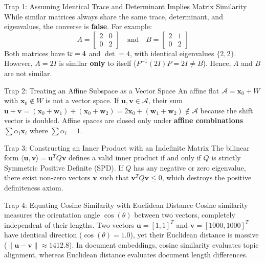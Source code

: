 \begin{trapbox}{Trap 1: Assuming Identical Trace and Determinant Implies Matrix Similarity}
While similar matrices always share the same trace, determinant, and eigenvalues, the converse is \textbf{false}. For example:
\begin{equation*}
A = \begin{bmatrix} 2 & 0 \\ 0 & 2 \end{bmatrix} \quad \text{and} \quad B = \begin{bmatrix} 2 & 1 \\ 0 & 2 \end{bmatrix}
\end{equation*}
Both matrices have $\operatorname{tr} = 4$ and $\det = 4$, with identical eigenvalues $\{2, 2\}$. However, $A = 2I$ is similar \textbf{only} to itself ($P^{-1}(2I)P = 2I \neq B$). Hence, $A$ and $B$ are not similar.
\end{trapbox}

\begin{trapbox}{Trap 2: Treating an Affine Subspace as a Vector Space}
An affine flat $\mathcal{A} = \mathbf{x}_0 + W$ with $\mathbf{x}_0 \notin W$ is not a vector space. If $\mathbf{u}, \mathbf{v} \in \mathcal{A}$, their sum $\mathbf{u} + \mathbf{v} = (\mathbf{x}_0 + \mathbf{w}_1) + (\mathbf{x}_0 + \mathbf{w}_2) = 2\mathbf{x}_0 + (\mathbf{w}_1 + \mathbf{w}_2) \notin \mathcal{A}$ because the shift vector is doubled. Affine spaces are closed only under \textbf{affine combinations} $\sum \alpha_i \mathbf{x}_i$ where $\sum \alpha_i = 1$.
\end{trapbox}

\begin{trapbox}{Trap 3: Constructing an Inner Product with an Indefinite Matrix}
The bilinear form $\langle \mathbf{u}, \mathbf{v} \rangle = \mathbf{u}^T Q \mathbf{v}$ defines a valid inner product if and only if $Q$ is strictly Symmetric Positive Definite (SPD). If $Q$ has any negative or zero eigenvalue, there exist non-zero vectors $\mathbf{v}$ such that $\mathbf{v}^T Q \mathbf{v} \le 0$, which destroys the positive definiteness axiom.
\end{trapbox}

\begin{trapbox}{Trap 4: Equating Cosine Similarity with Euclidean Distance}
Cosine similarity measures the orientation angle $\cos(\theta)$ between two vectors, completely independent of their lengths. Two vectors $\mathbf{u} = [1, 1]^T$ and $\mathbf{v} = [1000, 1000]^T$ have identical direction ($\cos(\theta) = 1.0$), yet their Euclidean distance is massive ($\|\mathbf{u} - \mathbf{v}\| \approx 1412.8$). In document embeddings, cosine similarity evaluates topic alignment, whereas Euclidean distance evaluates document length differences.
\end{trapbox}

